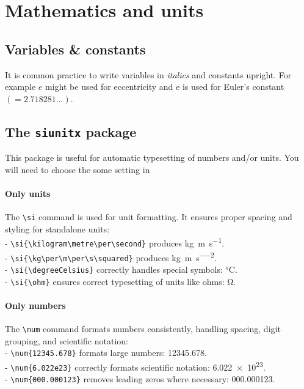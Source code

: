 \section{Mathematics and units}


\subsection{Variables \& constants}
	
	It is common practice to write variables in \textit{italics} and constants upright. For example $e$ might be used for eccentricity and $\mathrm{e} $ is used for Euler's constant $(=\num{2.718281}\dots)$. 


\subsection{The  \texttt{siunitx} package}

	This package is useful for automatic typesetting of numbers and/or units. You will need to choose the some setting in %
	
	\paragraph*{Only units}
	The \verb|\si| command is used for unit formatting. It ensures proper spacing and styling for standalone units:  \\
	- \verb|\si{\kilogram\metre\per\second}| produces \si{\kilogram\metre\per\second}.  \\
	- \verb|\si{\kg\per\m\per\s\squared}| produces \si{\kg\per\m\per\s\squared}.  \\
	- \verb|\si{\degreeCelsius}| correctly handles special symbols: \si{\degreeCelsius}.  \\
	- \verb|\si{\ohm}| ensures correct typesetting of units like ohms: \si{\ohm}.  
	
	\paragraph*{Only numbers}
	The \verb|\num| command formats numbers consistently, handling spacing, digit grouping, and scientific notation:  \\
	- \verb|\num{12345.678}| formats large numbers: \num{12345.678}. \\ 
	- \verb|\num{6.022e23}| correctly formats scientific notation: \num{6.022e23}.  \\
	- \verb|\num{000.000123}| removes leading zeros where necessary: \num{000.000123}.  
	
